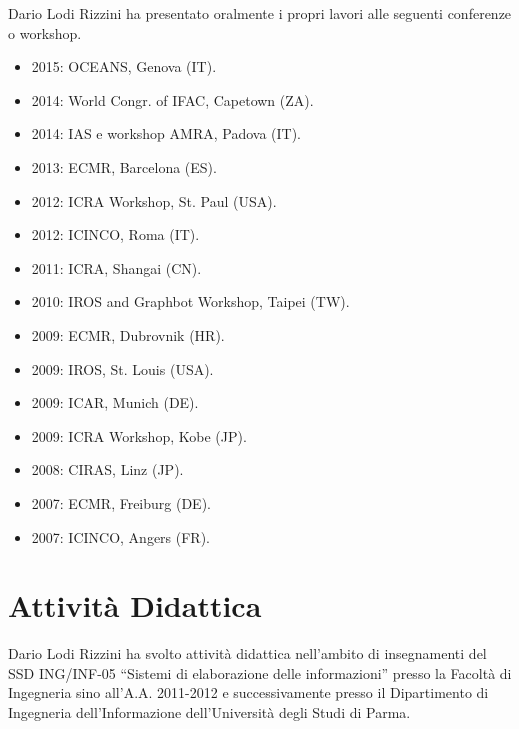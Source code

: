 \documentclass[11pt]{article}
\newcommand{\ITEMDATE}[1]{\item \textit{#1:}\\}
\begin{document}
Dario Lodi Rizzini ha presentato oralmente i propri lavori alle seguenti conferenze o workshop.
\begin{itemize}
\item 2015: OCEANS, Genova (IT).
\item 2014: World Congr. of IFAC, Capetown (ZA).
\item 2014: IAS e workshop AMRA, Padova (IT).
\item 2013: ECMR, Barcelona (ES). 
\item 2012: ICRA Workshop, St. Paul (USA). 
\item 2012: ICINCO, Roma (IT). 
\item 2011: ICRA, Shangai (CN). 
\item 2010: IROS and Graphbot Workshop, Taipei (TW).
\item 2009: ECMR, Dubrovnik (HR).
\item 2009: IROS, St. Louis (USA).
\item 2009: ICAR, Munich (DE).
\item 2009: ICRA Workshop, Kobe (JP).
\item 2008: CIRAS, Linz (JP).
\item 2007: ECMR, Freiburg (DE).
\item 2007: ICINCO, Angers (FR).
\end{itemize}




\section{Attivit\`a Didattica}

Dario Lodi Rizzini ha svolto attivit\`a didattica nell'ambito di insegnamenti del 
SSD ING/INF-05 ``Sistemi di elaborazione delle informazioni'' presso la Facolt\`a di Ingegneria 
sino all'A.A. 2011-2012 e successivamente presso il Dipartimento di Ingegneria dell'Informazione 
dell'Universit\`a degli Studi di Parma. 
\end{document}
